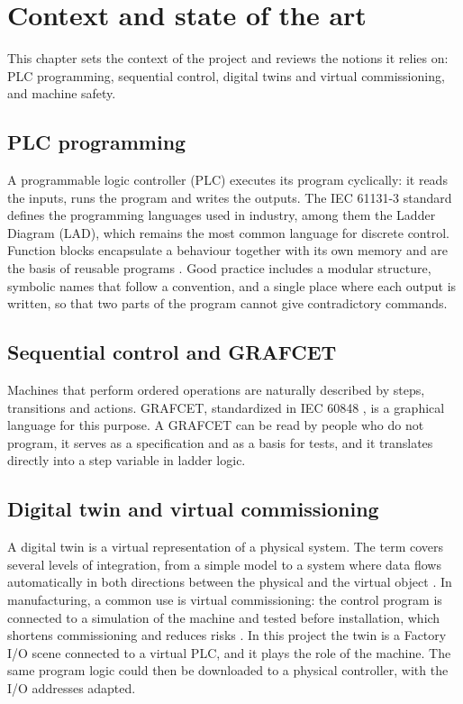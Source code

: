 \documentclass[11pt,a4paper]{report}
\begin{document}
\chapter{Context and state of the art}\label{ch:context}
This chapter sets the context of the project and reviews the notions it relies on: PLC programming, sequential control, digital twins and virtual commissioning, and machine safety.

\section{PLC programming}
A programmable logic controller (PLC) executes its program cyclically: it reads the inputs, runs the program and writes the outputs. The IEC 61131-3 standard \cite{iec61131} defines the programming languages used in industry, among them the Ladder Diagram (LAD), which remains the most common language for discrete control. Function blocks encapsulate a behaviour together with its own memory and are the basis of reusable programs \cite{john2010}. Good practice includes a modular structure, symbolic names that follow a convention, and a single place where each output is written, so that two parts of the program cannot give contradictory commands.

\section{Sequential control and GRAFCET}
Machines that perform ordered operations are naturally described by steps, transitions and actions. GRAFCET, standardized in IEC 60848 \cite{iec60848}, is a graphical language for this purpose. A GRAFCET can be read by people who do not program, it serves as a specification and as a basis for tests, and it translates directly into a step variable in ladder logic.

\section{Digital twin and virtual commissioning}
A digital twin is a virtual representation of a physical system. The term covers several levels of integration, from a simple model to a system where data flows automatically in both directions between the physical and the virtual object \cite{grieves2017,kritzinger2018}. In manufacturing, a common use is virtual commissioning: the control program is connected to a simulation of the machine and tested before installation, which shortens commissioning and reduces risks \cite{lee2014}. In this project the twin is a Factory I/O scene \cite{factoryio} connected to a virtual PLC, and it plays the role of the machine. The same program logic could then be downloaded to a physical controller, with the I/O addresses adapted.
\end{document}
